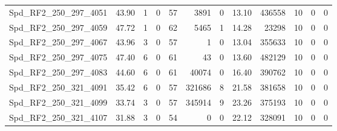 \begin{longtable}[c]{@{}lrrrrrrrrrrr@{}}
Spd\_RF2\_250\_297\_4051      & 43.90                  & 1                       & 0                       & 57                     & 3891                    & 0                       & 13.10                   & 436558                   & 10                       & 0                        & 0                        \\
Spd\_RF2\_250\_297\_4059      & 47.72                  & 1                       & 0                       & 62                     & 5465                    & 1                       & 14.28                   & 23298                    & 10                       & 0                        & 0                        \\
Spd\_RF2\_250\_297\_4067      & 43.96                  & 3                       & 0                       & 57                     & 1                       & 0                       & 13.04                   & 355633                   & 10                       & 0                        & 0                        \\
Spd\_RF2\_250\_297\_4075      & 47.40                  & 6                       & 0                       & 61                     & 43                      & 0                       & 13.60                   & 482129                   & 10                       & 0                        & 0                        \\
Spd\_RF2\_250\_297\_4083      & 44.60                  & 6                       & 0                       & 61                     & 40074                   & 0                       & 16.40                   & 390762                   & 10                       & 0                        & 0                        \\
Spd\_RF2\_250\_321\_4091      & 35.42                  & 6                       & 0                       & 57                     & 321686                  & 8                       & 21.58                   & 381658                   & 10                       & 0                        & 0                        \\
Spd\_RF2\_250\_321\_4099      & 33.74                  & 3                       & 0                       & 57                     & 345914                  & 9                       & 23.26                   & 375193                   & 10                       & 0                        & 0                        \\
Spd\_RF2\_250\_321\_4107      & 31.88                  & 3                       & 0                       & 54                     & 0                       & 0                       & 22.12                   & 328091                   & 10                       & 0                        & 0                        \\

\end{longtable}
